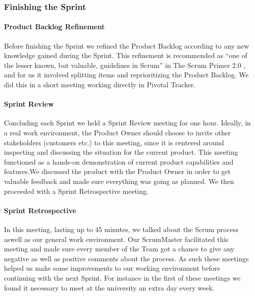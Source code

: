 \subsubsection{Finishing the Sprint}

\paragraph{Product Backlog Refinement}
Before finishing the Sprint we refined the Product Backlog according to any new knowledge gained during the Sprint. This refinement is recommended as ``one of the lesser known, but valuable, guidelines in Scrum'' in The Scrum Primer 2.0 \cite{ScrumPrimer2}, and for us it involved splitting items and reprioritizing the Product Backlog. We did this in a short meeting working directly in Pivotal Tracker.

\paragraph{Sprint Review}
Concluding each Sprint we held a Sprint Review meeting for one hour. Ideally, in a real work environment, the Product Owner should choose to invite other stakeholders (customers etc.) to this meeting, since it is centered around inspecting and discussing the situation for the current product. This meeting functioned as a hands-on demonstration of current product capabilities and features.We discussed the product with the Product Owner in order to get valuable feedback and made sure everything was going as planned. We then proceeded with a Sprint Retrospective meeting.

\paragraph{Sprint Retrospective}
In this meeting, lasting up to 45 minutes, we talked about the Scrum process aswell as our general work environment. Our ScrumMaster facilitated this meeting and made sure every member of the Team got a chance to give any negative as well as positive comments about the process. As such these meetings helped us make some improvements to our working environment before continuing with the next Sprint. For instance in the first of these meetings we found it necessary to meet at the university an extra day every week.